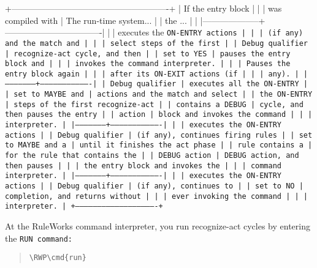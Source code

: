 +-------------------------------------------------------+
| If the entry block |                                  |
| was compiled with  | The run-time system...           |
| the ...            |                                  |
|--------------------+----------------------------------|
|                    | executes the \tt{ON-ENTRY} actions    |
|                    | (if any) and the match and       |
|                    | select steps of the first        |
| Debug qualifier    | recognize-act cycle, and then    |
| set to \tt{YES}         | pauses the entry block and       |
|                    | invokes the command interpreter. |
|                    | Pauses the entry block again     |
|                    | after its ON-EXIT actions (if    |
|                    | any).                            |
|--------------------+----------------------------------|
| Debug qualifier    | executes all the ON-ENTRY        |
| set to \tt{MAYBE} and   | actions and the match and select |
| the \tt{ON-ENTRY}       | steps of the first recognize-act |
| contains a DEBUG   | cycle, and then pauses the entry |
| action             | block and invokes the command    |
|                    | interpreter.                     |
|--------------------+----------------------------------|
|                    | executes the ON-ENTRY actions    |
| Debug qualifier    | (if any), continues firing rules |
| set to MAYBE and a | until it finishes the act phase  |
| rule contains a    | for the rule that contains the   |
| DEBUG action       | DEBUG action, and then pauses    |
|                    | the entry block and invokes the  |
|                    | command interpreter.             |
|--------------------+----------------------------------|
|                    | executes the ON-ENTRY actions    |
| Debug qualifier    | (if any), continues to           |
| set to NO          | completion, and returns without  |
|                    | ever invoking the command        |
|                    | interpreter.                     |
+-------------------------------------------------------+

At the RuleWorks command interpreter, you run recognize-act cycles by
entering the \tt{RUN} command:

\begin{quote}
\begin{Verbatim}[commandchars=\\\{\}]
\RWP\cmd{run}
\end{Verbatim}
\end{quote}

